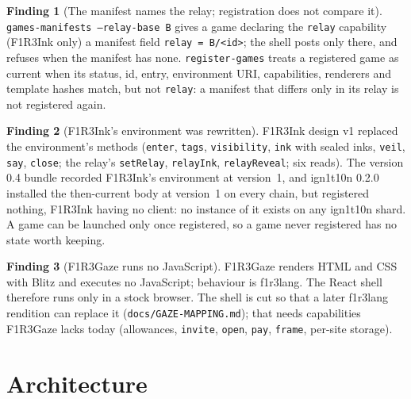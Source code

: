\documentclass[11pt]{article}
\theoremstyle{definition}
\newtheorem{finding}{Finding}
\theoremstyle{remark}
\newcommand{\code}[1]{\texttt{#1}}
\newcommand{\Gz}{F1R3Gaze}
\newcommand{\Hr}{ign1t10n}
\begin{document}
\begin{finding}[The manifest names the relay; registration does not compare it]\label{f:matches}
\code{games-manifests --relay-base B} gives a game declaring the \code{relay}
capability (F1R3Ink only) a manifest field \code{relay = B/<id>}; the shell posts
only there, and refuses when the manifest has none. \code{register-games} treats a
registered game as current when its status, id, entry, environment URI, capabilities,
renderers and template hashes match, but not \code{relay}: a manifest that differs
only in its relay is not registered again.
\end{finding}

\begin{finding}[F1R3Ink's environment was rewritten]\label{f:inkenv}
F1R3Ink design v1 replaced the environment's methods (\code{enter}, \code{tags},
\code{visibility}, \code{ink} with sealed inks, \code{veil}, \code{say},
\code{close}; the relay's \code{setRelay}, \code{relayInk}, \code{relayReveal}; six
reads). The version 0.4 bundle recorded F1R3Ink's environment at version~1, and \Hr{}
0.2.0 installed the then-current body at version~1 on every chain, but registered
nothing, F1R3Ink having no client: no instance of it exists on any \Hr{} shard. A game
can be launched only once registered, so a game never registered has no state worth
keeping.
\end{finding}

\begin{finding}[\Gz{} runs no JavaScript]\label{f:gazejs}
\Gz{} renders HTML and CSS with Blitz and executes no JavaScript; behaviour is
f1r3lang. The React shell therefore runs only in a stock browser. The shell is cut so
that a later f1r3lang rendition can replace it (\code{docs/GAZE-MAPPING.md}); that
needs capabilities \Gz{} lacks today (allowances, \code{invite}, \code{open},
\code{pay}, \code{frame}, per-site storage).
\end{finding}

\section{Architecture}\label{sec:arch}
\end{document}
